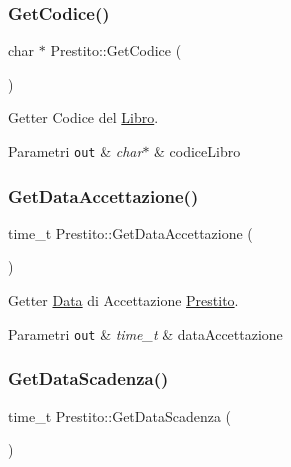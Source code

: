 \subsubsection{\texorpdfstring{Get\+Codice()}{GetCodice()}}
{\footnotesize\ttfamily char $\ast$ Prestito\+::\+Get\+Codice (\begin{DoxyParamCaption}{ }\end{DoxyParamCaption})}



Getter Codice del \mbox{\hyperlink{class_libro}{Libro}}. 


\begin{DoxyParams}[1]{Parametri}
\mbox{\tt out}  & {\em char$\ast$} & codice\+Libro \\
\hline
\end{DoxyParams}
\mbox{\label{class_prestito_afacba47375912f9d86b44cfae6bfd138}} 
\subsubsection{\texorpdfstring{Get\+Data\+Accettazione()}{GetDataAccettazione()}}
{\footnotesize\ttfamily time\+\_\+t Prestito\+::\+Get\+Data\+Accettazione (\begin{DoxyParamCaption}{ }\end{DoxyParamCaption})}



Getter \mbox{\hyperlink{class_data}{Data}} di Accettazione \mbox{\hyperlink{class_prestito}{Prestito}}. 


\begin{DoxyParams}[1]{Parametri}
\mbox{\tt out}  & {\em time\+\_\+t} & data\+Accettazione \\
\hline
\end{DoxyParams}
\mbox{\label{class_prestito_aefa87f49dcf99abf28ae20ebdb5f0325}} 
\subsubsection{\texorpdfstring{Get\+Data\+Scadenza()}{GetDataScadenza()}}
{\footnotesize\ttfamily time\+\_\+t Prestito\+::\+Get\+Data\+Scadenza (\begin{DoxyParamCaption}{ }\end{DoxyParamCaption})}



